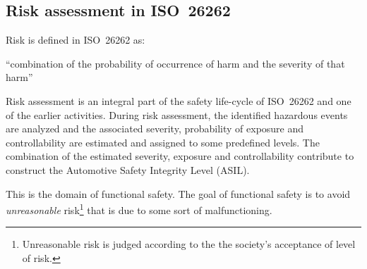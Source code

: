 \subsection{Risk assessment in ISO~26262}

Risk is defined in ISO~26262 as:
\begin{definition}
	``combination of the probability of occurrence of harm and the severity of that harm'' 
\end{definition}



Risk assessment is an integral part of the safety life-cycle of ISO~26262 and one of the earlier activities. 
During risk assessment, the identified hazardous events are analyzed and the associated severity, probability of exposure and controllability are estimated and assigned to some predefined levels. 
The combination of the estimated severity, exposure and controllability contribute to construct the Automotive Safety Integrity Level (ASIL). 


This is the domain of functional safety. 
The goal of functional safety is to avoid \emph{unreasonable} risk\footnote{Unreasonable risk is judged according to the the society's acceptance of level of risk.} that is due to some sort of malfunctioning.

